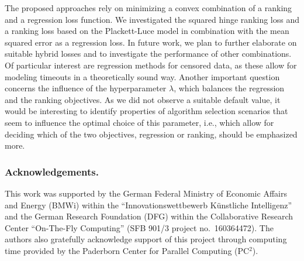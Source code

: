 \documentclass[runningheads]{llncs}
\begin{document}
The proposed approaches rely on minimizing a convex combination of a ranking and a regression loss function. We investigated the squared hinge ranking loss and a ranking loss based on the Plackett-Luce model in combination with the mean squared error as a regression loss. In future work, we plan to further elaborate on suitable hybrid losses and to investigate the performance of other combinations. Of particular interest are regression methods for censored data, as these allow for modeling timeouts in a theoretically sound way. Another important question concerns the influence of the hyperparameter $\lambda$, which balances the regression and the ranking objectives. As we did not observe a suitable default value, it would be interesting to identify properties of algorithm selection scenarios that seem to influence the optimal choice of this parameter, i.e., which allow for deciding which of the two objectives, regression or ranking, should be emphasized more.

\subsubsection*{Acknowledgements.}
This work was supported by the German Federal Ministry of Economic Affairs and Energy (BMWi) within the ``Innovationswettbewerb Künstliche Intelligenz'' and the German Research Foundation (DFG) within the Collaborative Research Center ``On-The-Fly Computing'' (SFB 901/3 project no.\ 160364472).
The authors also gratefully acknowledge support of this project through computing time provided by the Paderborn Center for Parallel Computing (PC$^2$).



\end{document}
